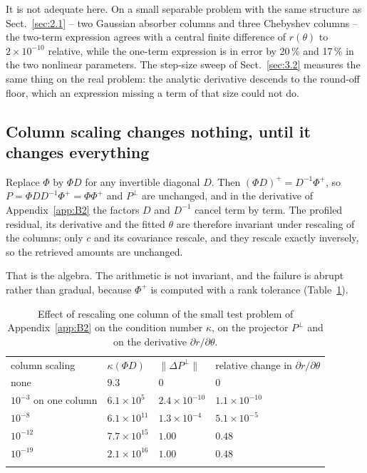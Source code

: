 It is not adequate here. On a small separable problem with the same structure
as Sect.~\ref{sec:2.1} -- two Gaussian absorber columns and three Chebyshev columns -- the
two-term expression agrees with a central finite difference of $r(\theta)$ to
$2\times10^{-10}$ relative, while the one-term expression is in error by 20\,\%
and 17\,\% in the two nonlinear parameters. The step-size sweep of Sect.~\ref{sec:3.2} measures
the same thing on the real problem: the analytic derivative descends to the
round-off floor, which an expression missing a term of that size could not do.

\subsection{Column scaling changes nothing, until it changes everything}
\label{app:B3}

Replace $\Phi$ by $\Phi D$ for any invertible diagonal $D$. Then
$(\Phi D)^{+} = D^{-1}\Phi^{+}$, so $P = \Phi D D^{-1}\Phi^{+} = \Phi\Phi^{+}$
and $P^{\perp}$ are unchanged, and in the derivative of Appendix~\ref{app:B2} the factors
$D$ and $D^{-1}$ cancel term by term. The profiled residual, its derivative
and the fitted $\theta$ are therefore invariant under rescaling of the
columns; only $c$ and its covariance rescale, and they rescale exactly
inversely, so the retrieved amounts are unchanged.

That is the algebra. The arithmetic is not invariant, and the failure is
abrupt rather than gradual, because $\Phi^{+}$ is computed with a rank
tolerance (Table~\ref{tab:colscaling}).

\begin{table}[t]
\caption{Effect of rescaling one column of the small test problem of Appendix~\ref{app:B2} on the condition number $\kappa$, on the projector $P^{\perp}$ and on the derivative $\partial r/\partial\theta$.}
\label{tab:colscaling}
\begin{tabular}{llll}
\tophline
column scaling & $\kappa(\Phi D)$ & $\lVert\Delta P^{\perp}\rVert$ & relative change in $\partial r/\partial\theta$ \\
\middlehline
none & $9.3$ & $0$ & $0$ \\
$10^{-3}$ on one column & $6.1\times10^{5}$ & $2.4\times10^{-10}$ & $1.1\times10^{-10}$ \\
$10^{-8}$ & $6.1\times10^{11}$ & $1.3\times10^{-4}$ & $5.1\times10^{-5}$ \\
$10^{-12}$ & $7.7\times10^{15}$ & $1.00$ & $0.48$ \\
$10^{-19}$ & $2.1\times10^{16}$ & $1.00$ & $0.48$ \\
\bottomhline
\end{tabular}
\end{table}

